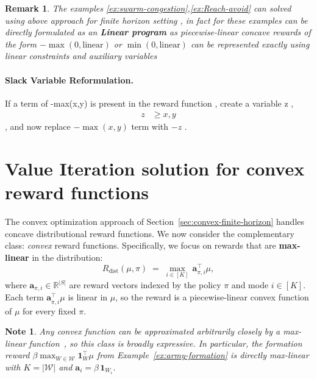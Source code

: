 \documentclass{article}
\newtheorem{remark}{Remark}
\newtheorem{note}{Note}
\begin{document}
\begin{remark}
    The examples \ref{ex:swarm-congestion},\ref{ex:Reach-avoid} can solved using above approach for finite horizon setting , in fact for these examples can be directly formulated as an \textbf{Linear program } as piecewise-linear concave rewards of the form $-\max(0,\text{linear})$ or $\min(0,\text{linear})$ can be represented exactly using linear constraints and auxiliary variables
\end{remark}




\paragraph{Slack Variable Reformulation.}

If a term of -max(x,y) is present in the reward function , create a variable z ,
\[
\begin{aligned}
z &\ge x, y
\end{aligned}
\] , and now replace $-\max(x,y)$ term with $-z$ .



\section{Value Iteration solution for convex reward functions }\label{sec:value-iteration}
The convex optimization approach of Section~\ref{sec:convex-finite-horizon} 
handles concave distributional reward functions. We now consider the 
complementary class: \emph{convex} reward functions. Specifically, we focus 
on rewards that are \textbf{max-linear} in the distribution:
\[
    R_{\mathrm{dist}}(\mu, \pi) 
    \;=\; \max_{i \in [K]} \,\mathbf{a}_{\pi,i}^\top \mu,
\]
where $\mathbf{a}_{\pi,i} \in \mathbb{R}^{|S|}$ are reward vectors indexed by 
the policy $\pi$ and mode $i \in [K]$. Each term $\mathbf{a}_{\pi,i}^\top \mu$ 
is linear in $\mu$, so the reward is a piecewise-linear convex function of 
$\mu$ for every fixed $\pi$.

\begin{note}
    Any convex function can be approximated arbitrarily closely by a 
    max-linear function~\citep{NIPS2010_68053af2}, so this class is broadly 
    expressive. In particular, the formation reward 
    $\beta\max_{W \in \mathcal{W}}\mathbf{1}_W^\top\mu$ from 
    Example~\ref{ex:army-formation} is directly max-linear with $K = |\mathcal{W}|$ 
    and $\mathbf{a}_i = \beta\,\mathbf{1}_{W_i}$.
\end{note}
\end{document}
